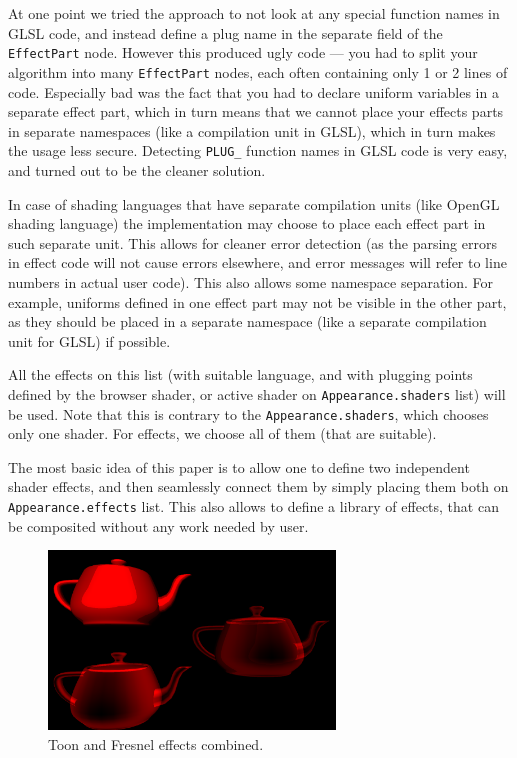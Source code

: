 \documentclass{acmsiggraph}                     %
\begin{document}
At one point we tried the approach
to not look at any special function names in GLSL code,
and instead define a plug name in the separate field of the \texttt{EffectPart}
node. However this produced ugly code --- you had to split your algorithm
into many \texttt{EffectPart} nodes, each often containing only 1 or 2 lines
of code. Especially bad was the fact that you had to declare uniform variables
in a separate effect part, which in turn means that we cannot place
your effects parts in separate namespaces (like a compilation unit in GLSL),
which in turn makes the usage less secure.
Detecting \texttt{PLUG\_} function names in GLSL code is very easy,
and turned out to be the cleaner solution.

In case of shading languages that have separate compilation units
(like OpenGL shading language) the implementation may choose to place
each effect part in such separate unit. This allows for cleaner error detection
(as the parsing errors in effect code will not cause errors elsewhere,
and error messages will refer to line numbers in actual user code).
This also allows some namespace separation. For example, uniforms defined in one
effect part may not be visible in the other part, as they should be placed
in a separate namespace (like a separate compilation unit for GLSL) if possible.

All the effects on this list (with suitable language, and with
plugging points defined by the browser shader, or active shader on
\texttt{Appearance.shaders} list) will be used. Note that this is contrary to
the \texttt{Appearance.shaders}, which chooses only one shader.
For effects, we choose all of them (that are suitable).

\needspace{1in}
The most basic idea of this paper is to allow one to define two
independent shader effects, and then seamlessly connect them by simply
placing them both on \texttt{Appearance.effects} list. This also allows to
define a library of effects, that can be composited without any work
needed by user.

\begin{figure}[H]
  \centering
  \includegraphics[width=3in]{fresnel_and_toon}
  \caption{Toon and Fresnel effects combined.}
\end{figure}
\end{document}
